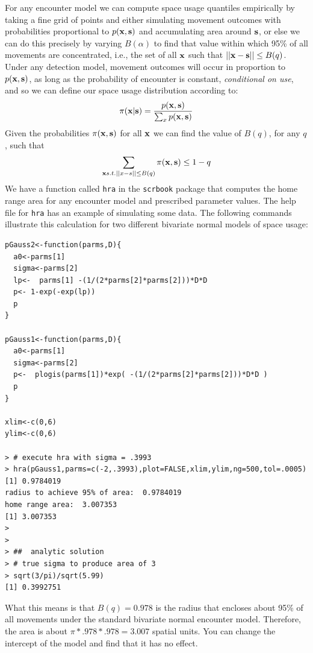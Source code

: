 For any encounter model we can compute space usage quantiles
empirically by taking a fine grid of points and either simulating
movement outcomes with probabilities proportional to $p({\bf x},{\bf s})$ and
accumulating area around ${\bf s}$, or else we can do this precisely
by varying $B(\alpha)$ to find that value within which 95\% of all
movements are concentrated, i.e., the set of all ${\bf x}$ such that
$||{\bf x}-{\bf s}|| \le B(q)$.  Under any detection model,
  movement outcomes will occur in proportion to $p({\bf x},{\bf s})$,
  as long as the probability of encounter is constant, {\it
    conditional on use}, and so we can define our space usage
  distribution according to:
\[
 \pi({\bf x}|{\bf s}) =\frac{p({\bf x},{\bf s})}{\sum_{x} p({\bf
     x},{\bf s}) }
\]
Given the probabilities $\pi({\bf x},{\bf s})$ for all ${\bf x}$ we
can find the value of $B(q)$, for any $q$, such that
\[
\sum_{{\bf x}
  s.t. ||x-s|| \le B(q) } \pi({\bf x},{\bf s}) \le 1-q
\]
We have a function
called \mbox{\tt hra} in the \mbox{\tt scrbook} package that computes
the home range area for any encounter model and prescribed parameter values. The help file
for \mbox{\tt hra} has an example of simulating some data.
The following commands illustrate this calculation for two different
bivariate normal models of space usage:
{\small
\begin{verbatim}
pGauss2<-function(parms,D){
  a0<-parms[1]
  sigma<-parms[2]
  lp<-  parms[1] -(1/(2*parms[2]*parms[2]))*D*D
  p<- 1-exp(-exp(lp))
  p
}

pGauss1<-function(parms,D){
  a0<-parms[1]
  sigma<-parms[2]
  p<-  plogis(parms[1])*exp( -(1/(2*parms[2]*parms[2]))*D*D )
  p
}

xlim<-c(0,6)
ylim<-c(0,6)

> # execute hra with sigma = .3993
> hra(pGauss1,parms=c(-2,.3993),plot=FALSE,xlim,ylim,ng=500,tol=.0005)
[1] 0.9784019
radius to achieve 95% of area:  0.9784019
home range area:  3.007353
[1] 3.007353
>
>
> ##  analytic solution
> # true sigma to produce area of 3
> sqrt(3/pi)/sqrt(5.99)
[1] 0.3992751
\end{verbatim}
}
What this means is that $B(q) = 0.978$ is the radius that
encloses about 95\% of all movements under the standard bivariate
normal encounter model.  Therefore, the area is about $\pi*.978*.978 =
3.007$ spatial units.  You can change the intercept of the model and
find that it has no effect.

